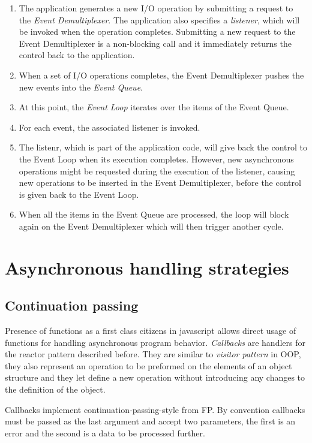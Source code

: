 \begin{enumerate}
\item The application generates a new I/O operation by submitting a request to the \textit{Event Demultiplexer}. The application also specifies a \textit{listener}, which will be invoked when the operation completes. Submitting a new request to the Event Demultiplexer is a non-blocking call and it immediately returns the control back to the application.
\item When a set of I/O operations completes, the Event Demultiplexer pushes the new events into the \textit{Event Queue}.
\item At this point, the \textit{Event Loop} iterates over the items of the Event Queue.
\item For each event, the associated listener is invoked.
\item The listenr, which is part of the application code, will give back the control to the Event Loop when its execution completes. However, new asynchronous operations might be requested during the execution of the listener, causing new operations to be inserted in the Event Demultiplexer, before the control is given back to the Event Loop.
\item When all the items in the Event Queue are processed, the loop will block again on the Event Demultiplexer which will then trigger another cycle.
\end{enumerate}

\section{Asynchronous handling strategies}
\subsection{Continuation passing}
Presence of functions as a first class citizens in javascript allows direct usage of functions for handling asynchronous program behavior. \textit{Callbacks} are handlers for the reactor pattern described before. They are similar to \textit{visitor pattern} in OOP, they also represent an operation to be preformed on the elements of an object structure and they let define a new operation without introducing any changes to the definition of the object. 

Callbacks implement continuation-passing-style from FP. By convention callbacks must be passed as the last argument and accept two parameters, the first is an error and the second is a data to be processed further.

